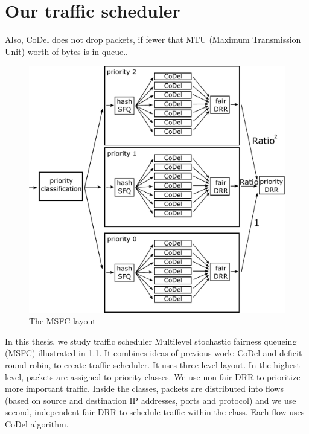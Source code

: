 \chapter{Our traffic scheduler}
\label{chap02}
Also, CoDel does not drop packets, if fewer that MTU (Maximum Transmission Unit) worth of bytes is in queue..


\begin{figure}
	\centering
	\includegraphics[width=137mm]{drawings/msfc}
	\caption{The MSFC layout}
	\label{fig10:msfc}
\end{figure}

In this thesis, we study traffic scheduler Multilevel stochastic fairness queueing (MSFC) illustrated in \ref{fig10:msfc}. It combines ideas of previous work: CoDel and deficit round-robin, to create traffic scheduler. It uses three-level layout. In the highest level, packets are assigned to priority classes. We use non-fair DRR to prioritize more important traffic. Inside the classes, packets are distributed into flows (based on source and destination IP addresses, ports and protocol) and we use second, independent fair DRR to schedule traffic within the class. Each flow uses CoDel algorithm.

